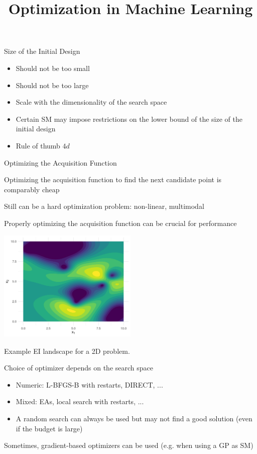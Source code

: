 \documentclass[11pt,compress,t,notes=noshow, xcolor=table]{beamer}
\title{Optimization in Machine Learning}
\date{}
\begin{document}

\begin{frame}{Size of the Initial Design}
  \begin{itemize}
    \item Should not be too small
    \item Should not be too large
    \item Scale with the dimensionality of the search space
    \item Certain SM may impose restrictions on the lower bound of the size of the initial design
    \item Rule of thumb $4d$
  \end{itemize}
\end{frame}

\begin{frame}{Optimizing the Acquisition Function}
  \begin{itemize}
    \item Optimizing the acquisition function to find the next candidate point is comparably cheap
    \item Still can be a hard optimization problem: non-linear, multimodal
    \item Properly optimizing the acquisition function can be crucial for performance
     {
    \begin{center}
    \includegraphics[width = 0.5\textwidth]{figure_man/practical.png}\\
    \begin{foonotesize}
    Example EI landscape for a 2D problem.
    \end{foonotesize}
    \end{center}
    }
     {
    \item Choice of optimizer depends on the search space
      \begin{itemize}
        \item Numeric: L-BFGS-B with restarts, DIRECT, ...
        \item Mixed: EAs, local search with restarts, ...
        \item A random search can always be used but may not find a good solution (even if the budget is large)
      \end{itemize}
    \item Sometimes, gradient-based optimizers can be used (e.g. when using a GP as SM)
    }
  \end{itemize}
\end{frame}
\end{document}
